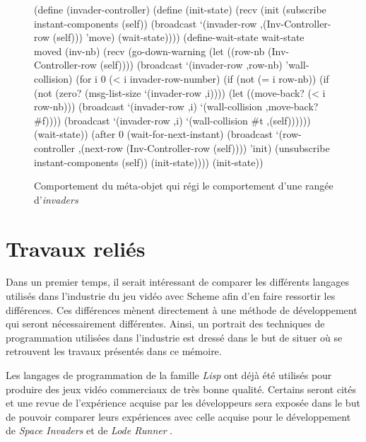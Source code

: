 \documentclass[12pt,oneside,letterpaper,francais]{book}
\newcommand{\lr}{{\textit{Lode Runner }}}
\newcommand{\si}{{\textit{Space Invaders }}}
\newcommand{\lisp}{{\textit{Lisp }}}
\newcommand{\scheme}[1]{\selectlanguage{english}{\tt #1}\selectlanguage{french}}
\begin{document}
\begin{figure}[htb!]
  \begin{schemecode}
(define (invader-controller)
  (define (init-state)
    (recv
     (init
      (subscribe instant-components (self))
      (broadcast `(invader-row ,(Inv-Controller-row (self)))
                 'move)
      (wait-state))))
  (define-wait-state wait-state moved (inv-nb)
    (recv
     (go-down-warning
      (let ((row-nb (Inv-Controller-row (self))))
        (broadcast `(invader-row ,row-nb) 'wall-collision)
        (for i 0 (< i invader-row-number)
             (if (not (= i row-nb))
                 (if (not (zero? (msg-list-size `(invader-row ,i))))
                     (let ((move-back? (< i row-nb)))
                       (broadcast `(invader-row ,i)
                                  `(wall-collision ,move-back? \#f))))
                 (broadcast `(invader-row ,i)
                            `(wall-collision  \#t ,(self))))))
      (wait-state))
     (after 0
            (wait-for-next-instant)
            (broadcast `(row-controller
                         ,(next-row (Inv-Controller-row (self))))
                       'init)
            (unsubscribe instant-components (self))
            (init-state))))
  (init-state))
  \end{schemecode}
  \caption{Comportement du méta-objet \scheme{invader-controller} qui
    régi le comportement d'une rangée d'\textit{invaders}}
  \label{Exp:inv-cnt}
\end{figure}





\chapter{Travaux reliés}


Dans un premier temps, il serait intéressant de comparer les
différents langages utilisés dans l'industrie du jeu vidéo avec Scheme
afin d'en faire ressortir les différences. Ces différences mènent
directement à une méthode de développement qui seront nécessairement
différentes. Ainsi, un portrait des techniques de programmation
utilisées dans l'industrie est dressé dans le but de situer où se
retrouvent les travaux présentés dans ce mémoire.

Les langages de programmation de la famille \lisp ont déjà été utilisés
pour produire des jeux vidéo commerciaux de très bonne
qualité. Certains seront cités et une revue de l'expérience acquise
par les développeurs sera exposée dans le but de pouvoir comparer
leurs expériences avec celle acquise pour le développement de \si et
de \lr.
\end{document}
